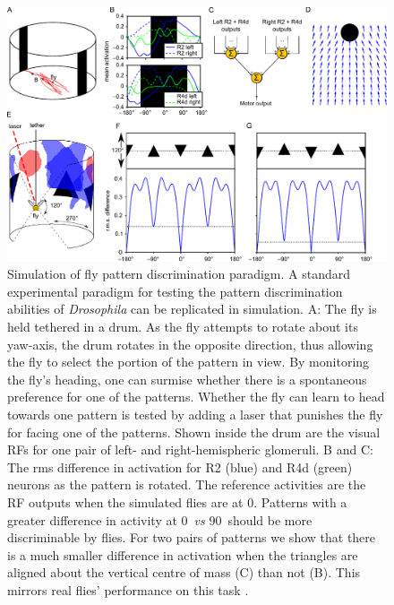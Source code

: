 \begin{figure}
\centering
\includegraphics{figures/recap}
\caption{Simulation of fly pattern discrimination paradigm. A standard experimental paradigm for testing the pattern discrimination abilities of \emph{Drosophila} \protect\cite{Ernst1999} can be replicated in simulation.
A: The fly is held tethered in a drum. As the fly attempts to rotate about its yaw-axis, the drum rotates in the opposite direction, thus allowing the fly to select the portion of the pattern in view.
By monitoring the fly's heading, one can surmise whether there is a spontaneous preference for one of the patterns.
Whether the fly can learn to head towards one pattern is tested by adding a laser that punishes the fly for facing one of the patterns.
Shown inside the drum are the visual \acp{RF} for one pair of left- and right-hemispheric glomeruli.
B and C: The \ac{rms} difference in activation for R2 (blue) and R4d (green) neurons as the pattern is rotated.
The reference activities are the \ac{RF} outputs when the simulated flies are at 0\degree.
Patterns with a greater difference in activity at 0\degree\ \emph{vs} 90\degree\ should be more discriminable by flies.
For two pairs of patterns we show that there is a much smaller difference in activation when the triangles are aligned about the vertical centre of mass (C) than not (B).
This mirrors real flies' performance on this task \protect\cite{Ernst1999}.}
\label{fig:recap}
\end{figure}
